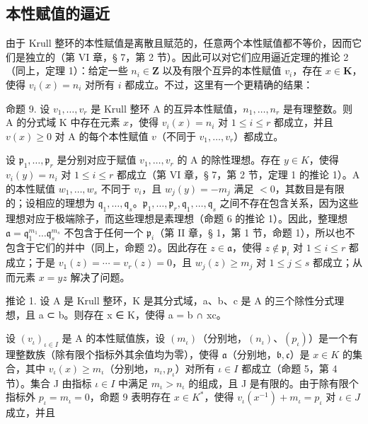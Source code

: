 \subsection{本性赋值的逼近}

由于 Krull 整环的本性赋值是离散且赋范的，任意两个本性赋值都不等价，因而它们是独立的（第 VI 章，§ 7，第 2 节）。因此可以对它们应用逼近定理的推论 2（同上，定理 1）：给定一些 \(n_i \in \mathbf{Z}\) 以及有限个互异的本性赋值 \(v_i\)，存在 \(x \in \mathbf{K}\)，使得 \(v_i(x) = n_i\) 对所有 \(i\) 都成立。不过，这里有一个更精确的结果：

命题 9. 设 \(v_1, \ldots, v_r\) 是 Krull 整环 A 的互异本性赋值，\(n_1, \ldots, n_r\) 是有理整数。则 A 的分式域 K 中存在元素 \(x\)，使得 \(v_i(x) = n_i\) 对 \(1 \leqslant i \leqslant r\) 都成立，并且 \(v(x) \geqslant 0\) 对 A 的每个本性赋值 \(v\)（不同于 \(v_1, \ldots, v_r\)）都成立。

设 \(\mathfrak{p}_1, \ldots, \mathfrak{p}_r\) 是分别对应于赋值 \(v_1, \ldots, v_r\) 的 A 的除性理想。存在 \(y \in K\)，使得 \(v_i(y) = n_i\) 对 \(1 \leqslant i \leqslant r\) 都成立（第 VI 章，§ 7，第 2 节，定理 1 的推论 1）。A 的本性赋值 \(w_1, \ldots, w_s\) 不同于 \(v_i\)，且 \(w_j(y) = -m_j\) 满足 \(<0\)，其数目是有限的；设相应的理想为 \(\mathfrak{q}_1, \ldots, \mathfrak{q}_s\)。\(\mathfrak{p}_1, \ldots, \mathfrak{p}_r, \mathfrak{q}_1, \ldots, \mathfrak{q}_s\) 之间不存在包含关系，因为这些理想对应于极端除子，而这些理想是素理想（命题 6 的推论 1）。因此，整理想 \(\mathfrak{a} = \mathfrak{q}_1^{m_1} \ldots \mathfrak{q}_s^{m_s}\) 不包含于任何一个 \(\mathfrak{p}_i\)（第 II 章，§ 1，第 1 节，命题 1），所以也不包含于它们的并中（同上，命题 2）。因此存在 \(z \in \mathfrak{a}\)，使得 \(z \notin \mathfrak{p}_i\) 对 \(1 \leqslant i \leqslant r\) 都成立；于是 \(v_1(z) = \cdots = v_r(z) = 0\)，且 \(w_j(z) \geqslant m_j\) 对 \(1 \leqslant j \leqslant s\) 都成立；从而元素 \(x = yz\) 解决了问题。

推论 1. 设 A 是 Krull 整环，K 是其分式域，a、b、c 是 A 的三个除性分式理想，且 a ⊂ b。则存在 x ∈ K，使得 a = b ∩ xc。

设 \((v_{\iota})_{\iota \in I}\) 是 A 的本性赋值族，设 \((m_{\iota})\)（分别地，\((n_{\iota})\)、\((p_{\iota})\)）是一个有理整数族（除有限个指标外其余值均为零），使得 \(\mathfrak{a}\)（分别地，\(\mathfrak{b}, \mathfrak{c}\)）是 \(x \in K\) 的集合，其中 \(v_{\iota}(x) \geqslant m_{\iota}\)（分别地，\(n_{\iota}, p_{\iota}\)）对所有 \(\iota \in I\) 都成立（命题 5，第 4 节）。集合 J 由指标 \(\iota \in I\) 中满足 \(m_{\iota} > n_{\iota}\) 的组成，且 J 是有限的。由于除有限个指标外 \(p_{\iota} = m_{\iota} = 0\)，命题 9 表明存在 \(x \in K^{*}\)，使得 \(v_{\iota}(x^{-1}) + m_{\iota} = p_{\iota}\) 对 \(\iota \in J\) 成立，并且

